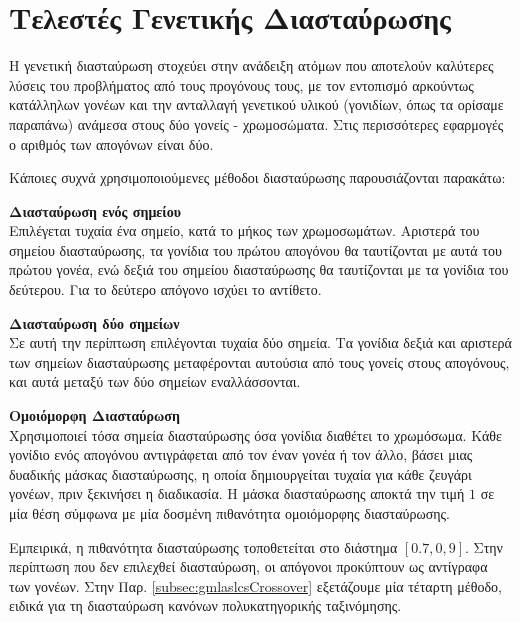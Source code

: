\section{Τελεστές Γενετικής Διασταύρωσης}
Η γενετική διασταύρωση στοχεύει στην ανάδειξη ατόμων που αποτελούν καλύτερες λύσεις του προβλήματος από τους προγόνους τους, με τον εντοπισμό αρκούντως κατάλληλων γονέων και την ανταλλαγή γενετικού υλικού (γονιδίων, όπως τα ορίσαμε παραπάνω) ανάμεσα στους δύο γονείς - χρωμοσώματα. Στις περισσότερες εφαρμογές ο αριθμός των απογόνων είναι δύο.

Κάποιες συχνά χρησιμοποιούμενες μέθοδοι διασταύρωσης παρουσιάζονται παρακάτω:

\begin{description}
\item\textbf{Διασταύρωση ενός σημείου}
\\
Επιλέγεται τυχαία ένα σημείο, κατά το μήκος των χρωμοσωμάτων. Αριστερά του σημείου διασταύρωσης, τα γονίδια του πρώτου απογόνου θα ταυτίζονται με αυτά του πρώτου γονέα, ενώ δεξιά του σημείου διασταύρωσης θα ταυτίζονται με τα γονίδια του δεύτερου. Για το δεύτερο απόγονο ισχύει το αντίθετο.
\item\textbf{Διασταύρωση δύο σημείων}
\\
Σε αυτή την περίπτωση επιλέγονται τυχαία δύο σημεία. Τα γονίδια δεξιά και αριστερά των σημείων διασταύρωσης μεταφέρονται αυτούσια από τους γονείς στους απογόνους, και αυτά μεταξύ των δύο σημείων εναλλάσσονται.
\item\textbf{Ομοιόμορφη Διασταύρωση}
\\
Χρησιμοποιεί τόσα σημεία διασταύρωσης όσα γονίδια διαθέτει το χρωμόσωμα. Κάθε γονίδιο ενός απογόνου αντιγράφεται από τον έναν γονέα ή τον άλλο, βάσει μιας δυαδικής μάσκας διασταύρωσης, η οποία δημιουργείται τυχαία για κάθε ζευγάρι γονέων, πριν ξεκινήσει η διαδικασία. Η μάσκα διασταύρωσης αποκτά την τιμή $1$ σε μία θέση σύμφωνα με μία δοσμένη πιθανότητα ομοιόμορφης διασταύρωσης.
\end{description}

Εμπειρικά, η πιθανότητα διασταύρωσης τοποθετείται στο διάστημα $[0.7, 0,9]$. Στην περίπτωση που δεν επιλεχθεί διασταύρωση, οι απόγονοι προκύπτουν ως αντίγραφα των γονέων. Στην Παρ. \ref{subsec:gmlaslcsCrossover} εξετάζουμε μία τέταρτη μέθοδο, ειδικά για τη διασταύρωση κανόνων πολυκατηγορικής ταξινόμησης.

